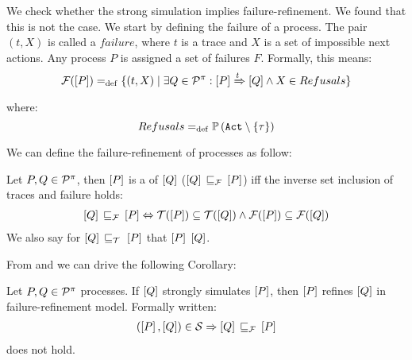 We check whether the strong simulation implies failure-refinement. We found that this is not the case. We start by defining the failure of a process.
The pair $(t, X)$ is called a $failure$, where $t$ is a trace and $X$ is a set of impossible next actions. Any process
$P$ is assigned a set of failures $F$. Formally, this means:
\begin{align}
    \failures[P] \define \{(t,X) \mid \exists Q\in\procs: \ec{P} \bigstep{t} \ec{Q}\wedge X\in Refusals\}
\label{failure}
\end{align}
where: \[Refusals \define \pom{\actions\setminus\set{\tau}}\]

We can define the failure-refinement of \picalc{} processes as follow:

\begin{definition}
\label{def_failure_ref}
	Let $P,Q\in\mathcal P^{\pi}$, then $\left[P\right]$ is a  of $\left[Q\right]$ ($\ec{Q}\refiF \ec{P}$) iff the inverse set inclusion of traces and failure holds:
\begin{align}
   \ec{Q} \refiF \ec{P} \Leftrightarrow  \traces[P]\subseteq\traces[Q] \wedge \failures[P]\subseteq\failures[Q]
\end{align}
	We also say for $\ec{Q}\refi{}\ec{P}$ that $\left[P\right]$  $\left[Q\right]$.
\end{definition}

From  and  we can drive the following Corollary: 

\begin{cor}
\label{cor_sim_failure_refinement}
Let $P,Q\in\mathcal P^{\pi}$ processes. If $\left[Q\right]$ strongly simulates $\left[P\right]$, then $\left[P\right]$ refines $\left[Q\right]$ in failure-refinement model. Formally written:
\begin{align}
    (\ec{P},\ec{Q})\in{}\simu  \Rightarrow \ec{Q} \refiF \ec{P}
   \label{failure_model}
\end{align}
does not hold.
\end{cor}%


